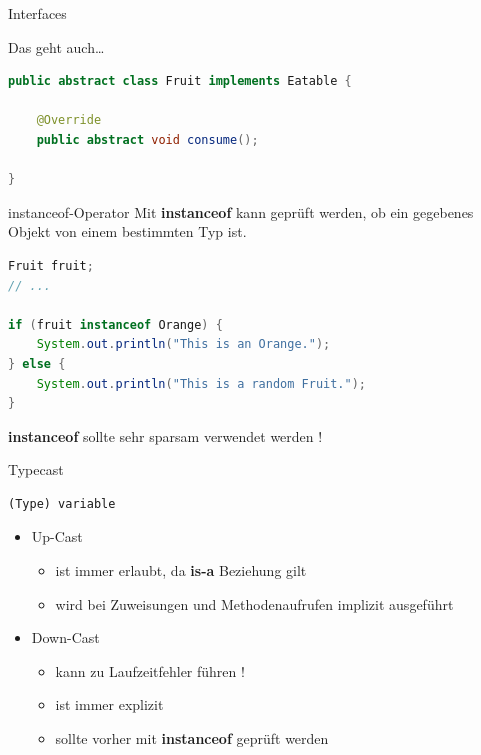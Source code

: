 \documentclass[18pt]{beamer}
\begin{document}
\begin{frame}[fragile]{Interfaces}

    Das geht auch\dots

    \begin{exampleblock}{}
        \begin{lstlisting}[language=Java,basicstyle=\scriptsize]
public abstract class Fruit implements Eatable {

    @Override
    public abstract void consume();

}
        \end{lstlisting}

    \end{exampleblock}
\end{frame}


\begin{frame}[fragile]{instanceof-Operator}
    Mit \textbf{instanceof} kann geprüft werden, ob ein gegebenes Objekt von einem bestimmten Typ ist.

    \begin{exampleblock}{}
        \begin{lstlisting}[language=Java,basicstyle=\scriptsize]
Fruit fruit;
// ...

if (fruit instanceof Orange) {
    System.out.println("This is an Orange.");
} else {
    System.out.println("This is a random Fruit.");
}
        \end{lstlisting}

    \end{exampleblock}

    \pause

    \alert{\textbf{instanceof} sollte sehr sparsam verwendet werden !}

\end{frame}

\begin{frame}[fragile]{Typecast}
    \begin{lstlisting}
(Type) variable
    \end{lstlisting}

    \vspace{.2in}
    \begin{itemize}
        \item Up-Cast
            \begin{itemize}
                \item ist immer erlaubt, da \textbf{is-a} Beziehung gilt
                \item wird bei Zuweisungen und Methodenaufrufen implizit ausgeführt
            \end{itemize}
        \item Down-Cast
        \begin{itemize}
            \item kann zu Laufzeitfehler führen !
            \item ist immer explizit
            \item sollte vorher mit \textbf{instanceof} geprüft werden
        \end{itemize}
    \end{itemize}
\end{frame}
\end{document}
